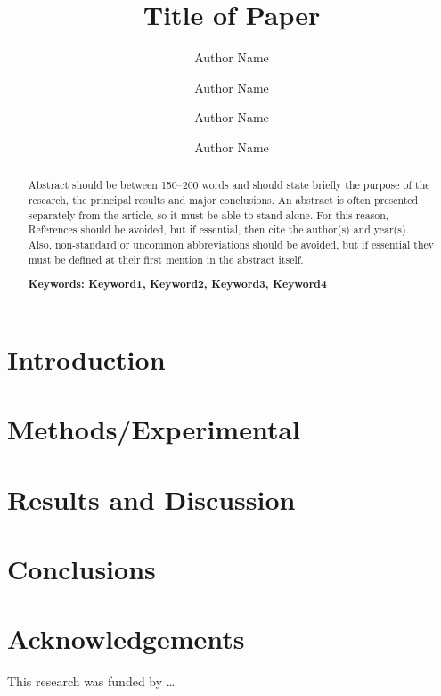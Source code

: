 \documentclass[12pt]{ussci}
\title{ Title of Paper }
\author[1]{Author Name}
\author[1]{Author Name}
\author[2]{Author Name}
\author[2,*]{Author Name}
\affil[1]{Department, Institution, Address, Country}
\affil[2]{Department, Institution, Address, Country}
\affil[*]{Corresponding author: \email{author@university.edu}}
\begin{document}
\maketitle

\begin{abstract} %
Abstract should be between 150--200 words and should state briefly the purpose
of the research, the principal results and major conclusions. An abstract is
often presented separately from the article, so it must be able to stand alone.
For this reason, References should be avoided, but if essential, then cite the
author(s) and year(s). Also, non-standard or uncommon abbreviations should be
avoided, but if essential they must be defined at their first mention in the
abstract itself.

\textbf{Keywords: Keyword1, Keyword2, Keyword3, Keyword4}
\end{abstract}

\section{Introduction}
%
\blindtext


\section{Methods/Experimental}
%
\blindtext


\section{Results and Discussion}
%
\blindtext


\section{Conclusions}
%
\blindtext


\section{Acknowledgements}
This research was funded by \ldots
\end{document}
